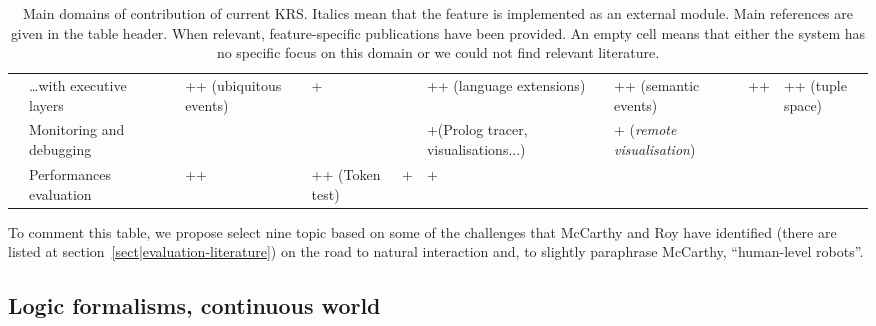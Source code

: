 \documentclass{IEEEtran}
\begin{document}
\begin{landscape}
\begin{table}
\begin{center}
\begin{tabular}{p{0.2cm}p{3.4cm}p{1.6cm}p{1.3cm}p{1.7cm}p{1.5cm}p{2cm}p{2cm}p{2cm}p{1.4cm}p{1.8cm}}
                                                      & \ldots with executive layers &                           & ++ (ubiquitous events)      & +                           &                             & ++ (language extensions) \cite{Beetz2010} &                                          & ++ (semantic events)                          & ++                            & ++ (tuple space)               \\
                                                          & Monitoring and debugging &                           &                             &                             &                             & +(Prolog tracer, visualisations...)&                                                 & + ({\em remote visualisation})                &                               &                                \\
                                                           & Performances evaluation &                           & ++ \cite{Hawes2008}         & ++ (Token test)             & +                           & + \cite{Tenorth2011}               &                                                 &                                               &                               &                                \\

\bottomrule

\end{tabular}
\end{center}

\caption{Main domains of contribution of current KRS. Italics mean that the
feature is implemented as an external module. Main references are given in the
table header. When relevant, feature-specific publications have been provided.
An empty cell means that either the system has no specific focus on this domain
or we could not find relevant literature.}

\label{table|contribution-by-systems}
\end{table}
\end{landscape}

To comment this table, we propose select nine topic based on some of the
challenges that McCarthy and Roy have identified (there are listed at
section~\ref{sect|evaluation-literature}) on the road to natural interaction
and, to slightly paraphrase McCarthy, ``human-level robots''.


\subsection{Logic formalisms, continuous world}
\end{document}
